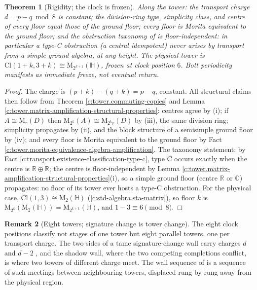 \documentclass[11pt]{article}
\newtheorem{theorem}{Theorem}[section]
\theoremstyle{definition}
\newtheorem{remark}[theorem]{Remark}
\theoremstyle{plain}
\providecommand{\C}{}\renewcommand{\C}{\mathbb{C}}
\providecommand{\Cl}{}\renewcommand{\Cl}{\mathrm{Cl}}
\providecommand{\HH}{}\renewcommand{\HH}{\mathbb{H}}
\providecommand{\Mat}{}\renewcommand{\Mat}{\mathrm{M}}
\providecommand{\R}{}\renewcommand{\R}{\mathbb{R}}
\begin{document}
\begin{theorem}[Rigidity; the clock is frozen]\label{c:tower.rigidity-clock-frozen}
Along the tower: the transport charge $d = p - q \bmod 8$ is constant; the division-ring type, simplicity class, and centre of every floor equal those of the ground floor; every floor is Morita equivalent to the ground floor; and the obstruction taxonomy of \cite{ButlerT1} is floor-independent: in particular a type-C obstruction (a central idempotent) never arises by transport from a simple ground algebra, at any height. The physical tower is $\Cl(1{+}k, 3{+}k) \cong \Mat_{2^{k+1}}(\HH)$, frozen at clock position $6$. Bott periodicity manifests as immediate freeze, not eventual return.
\end{theorem}
\begin{proof}
The charge is $(p{+}k) - (q{+}k) = p - q$, constant. All structural claims then follow from Theorem \ref{c:tower.commuting-copies} and Lemma \ref{c:tower.matrix-amplification-structural-properties}: centres agree by (i); if $A \cong \Mat_r(D)$ then $\Mat_{2^k}(A) \cong \Mat_{2^k r}(D)$ by (iii), the same division ring; simplicity propagates by (ii), and the block structure of a semisimple ground floor by (iv); and every floor is Morita equivalent to the ground floor by Fact \ref{c:tower.morita-equivalence-algebra-amplification}. The taxonomy statement: by Fact \ref{c:transport.existence-classification-type-c}, type C occurs exactly when the centre is $\R \oplus \R$; the centre is floor-independent by Lemma \ref{c:tower.matrix-amplification-structural-properties}(i), so a simple ground floor (centre $\R$ or $\C$) propagates: no floor of its tower ever hosts a type-C obstruction. For the physical case, $\Cl(1,3) \cong \Mat_2(\HH)$ \cite{Porteous1995} (\ref{c:std-algebra.sta-matrix}), so floor $k$ is $\Mat_{2^k}(\Mat_2(\HH)) = \Mat_{2^{k+1}}(\HH)$, and $1 - 3 \equiv 6 \pmod 8$.

\end{proof}

\begin{remark}[Eight towers; signature change is tower change]\label{c:note.tower.eight-towers-signature-change-tower-change}
The eight clock positions classify not stages of one tower but eight parallel towers, one per transport charge. The two sides of a tame signature-change wall carry charges $d$ and $d - 2$ \cite[\S 7.2]{ButlerT4}, and the shadow wall, where the two competing completions conflict, is where two towers of different charge meet. The wall sequence of \cite[Cor.~5.5]{ButlerT4} is a sequence of such meetings between neighbouring towers, displaced rung by rung away from the physical region.
\end{remark}
\end{document}
